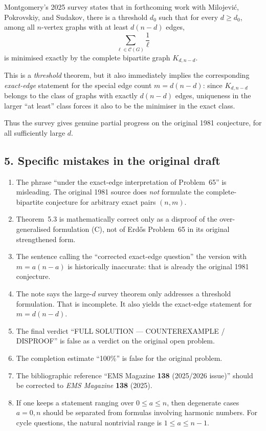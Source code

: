 Montgomery's 2025 survey states that in forthcoming work with Milojevi\'c, Pokrovskiy, and Sudakov, there is a threshold $d_0$ such that for every $d\ge d_0$, among all $n$-vertex graphs with at least $d(n-d)$ edges,
\[
\sum_{\ell\in \mathcal C(G)} \frac1\ell
\]
is minimised exactly by the complete bipartite graph $K_{d,n-d}$.

This is a \emph{threshold} theorem, but it also immediately implies the corresponding \emph{exact-edge} statement for the special edge count $m=d(n-d)$: since $K_{d,n-d}$ belongs to the class of graphs with exactly $d(n-d)$ edges, uniqueness in the larger ``at least'' class forces it also to be the minimiser in the exact class.

Thus the survey gives genuine partial progress on the original 1981 conjecture, for all sufficiently large $d$.

\subsection*{5. Specific mistakes in the original draft}

\begin{enumerate}
\item The phrase ``under the exact-edge interpretation of Problem~65'' is misleading. The original 1981 source does \emph{not} formulate the complete-bipartite conjecture for arbitrary exact pairs $(n,m)$.

\item Theorem~5.3 is mathematically correct only as a disproof of the over-generalised formulation (C), not of Erd\H{o}s Problem~65 in its original strengthened form.

\item The sentence calling the ``corrected exact-edge question'' the version with $m=a(n-a)$ is historically inaccurate: that is already the original 1981 conjecture.

\item The note says the large-$d$ survey theorem only addresses a threshold formulation. That is incomplete. It also yields the exact-edge statement for $m=d(n-d)$.

\item The final verdict ``FULL SOLUTION --- COUNTEREXAMPLE / DISPROOF'' is false as a verdict on the original open problem.

\item The completion estimate ``100\%'' is false for the original problem.

\item The bibliographic reference ``EMS Magazine \textbf{138} (2025/2026 issue)'' should be corrected to \emph{EMS Magazine} \textbf{138} (2025).

\item If one keeps a statement ranging over $0\le a\le n$, then degenerate cases $a=0,n$ should be separated from formulas involving harmonic numbers. For cycle questions, the natural nontrivial range is $1\le a\le n-1$.
\end{enumerate}

